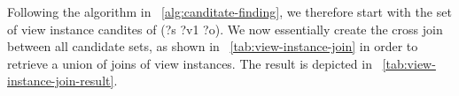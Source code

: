 \documentclass[a4paper,twoside,bibtotoc,abstracton,12pt,BCOR=15mm]{scrreprt}
\newcommand{\todo}[1]{\textbf{ToDo: \textit{#1}}}
\begin{document}
Following the algorithm in ~\autoref{alg:canditate-finding}, we therefore start with the set of view instance candites of (?s ?v1 ?o).
We now essentially create the cross join between all candidate sets, as shown in ~\autoref{tab:view-instance-join} in order to retrieve a union of joins of view instances. The result is depicted in ~\autoref{tab:view-instance-join-result}. 

















\end{document}
